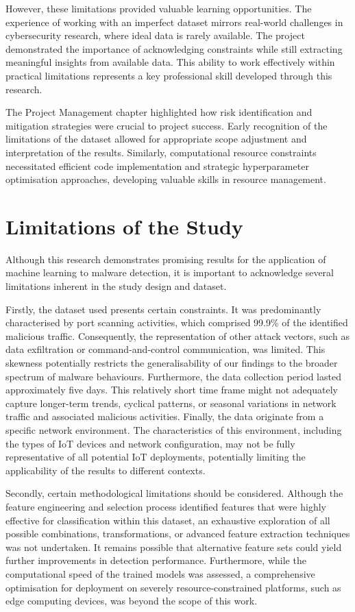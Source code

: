 However, these limitations provided valuable learning opportunities. The experience of working with an imperfect dataset mirrors real-world challenges in cybersecurity research, where ideal data is rarely available. The project demonstrated the importance of acknowledging constraints while still extracting meaningful insights from available data. This ability to work effectively within practical limitations represents a key professional skill developed through this research.

The Project Management chapter highlighted how risk identification and mitigation strategies were crucial to project success. Early recognition of the limitations of the dataset allowed for appropriate scope adjustment and interpretation of the results. Similarly, computational resource constraints necessitated efficient code implementation and strategic hyperparameter optimisation approaches, developing valuable skills in resource management.

\section{Limitations of the Study}

Although this research demonstrates promising results for the application of machine learning to malware detection, it is important to acknowledge several limitations inherent in the study design and dataset.

Firstly, the dataset used presents certain constraints. It was predominantly characterised by port scanning activities, which comprised 99.9\% of the identified malicious traffic. Consequently, the representation of other attack vectors, such as data exfiltration or command-and-control communication, was limited. This skewness potentially restricts the generalisability of our findings to the broader spectrum of malware behaviours. Furthermore, the data collection period lasted approximately five days. This relatively short time frame might not adequately capture longer-term trends, cyclical patterns, or seasonal variations in network traffic and associated malicious activities. Finally, the data originate from a specific network environment. The characteristics of this environment, including the types of IoT devices and network configuration, may not be fully representative of all potential IoT deployments, potentially limiting the applicability of the results to different contexts.

Secondly, certain methodological limitations should be considered. Although the feature engineering and selection process identified features that were highly effective for classification within this dataset, an exhaustive exploration of all possible combinations, transformations, or advanced feature extraction techniques was not undertaken. It remains possible that alternative feature sets could yield further improvements in detection performance. Furthermore, while the computational speed of the trained models was assessed, a comprehensive optimisation for deployment on severely resource-constrained platforms, such as edge computing devices, was beyond the scope of this work.


